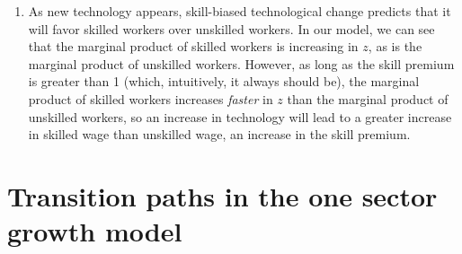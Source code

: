\documentclass[10pt]{article}
\begin{document}
\begin{enumerate}
	\item As new technology appears, skill-biased technological change predicts that it will favor skilled workers over unskilled workers. In our model, we can see that the marginal product of skilled workers is increasing in $z$, as is the marginal product of unskilled workers. However, as long as the skill premium is greater than 1 (which, intuitively, it always should be), the marginal product of skilled workers increases \emph{faster} in $z$ than the marginal product of unskilled workers, so an increase in technology will lead to a greater increase in skilled wage than unskilled wage, an increase in the skill premium.
\end{enumerate}


\section*{Transition paths in the one sector growth model}
\end{document}
